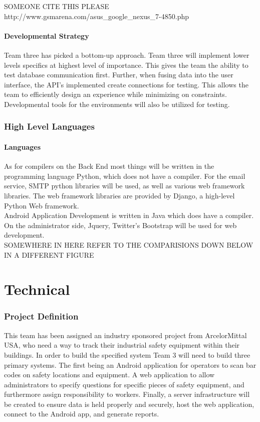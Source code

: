 \documentclass[Letter,11pt]{article}
\begin{document}
	\cite{nexus7}
	SOMEONE CITE THIS PLEASE http://www.gsmarena.com/asus_google_nexus_7-4850.php \\
	
	\subsection{Developmental Strategy}
	Team three has picked a bottom-up approach. Team three will implement lower levels specifics at highest level of importance. This gives the team the ability to test database communication first. Further, when fusing data into the user interface, the API's implemented create connections for testing. This allows the team to efficiently design an experience while minimizing on constraints. Developmental tools for the environments will also be utilized for testing. \\ 

\section{High Level Languages}\label{highlevel}
	\subsection{Languages}
	As for compilers on the Back End most things will be written in the programming language Python, which does not have a compiler. For the email service, SMTP python libraries will be used, as well as various web framework libraries. The web framework libraries are provided by Django, a high-level Python Web framework. \\
	Android Application Development is written in Java which does have a compiler. On the administrator side, Jquery, Twitter's Bootstrap will be used for web development.   \\ SOMEWHERE IN HERE REFER TO THE COMPARISIONS DOWN BELOW IN A DIFFERENT FIGURE


\part{Technical}
\section{Project Definition}\label{def}
	This team has been assigned an industry sponsored project from ArcelorMittal USA, who need a way to track their industrial safety equipment within their buildings. In order to build the specified system Team 3 will need to build three primary systems. The first being an Android application for operators to scan bar codes on safety locations and equipment. A web application to allow administrators to specify questions for specific pieces of safety equipment, and furthermore assign responsibility to workers. Finally, a server infrastructure will be created to ensure data is held properly and securely, host the web application, connect to the Android app, and generate reports. 
			
\end{document}
